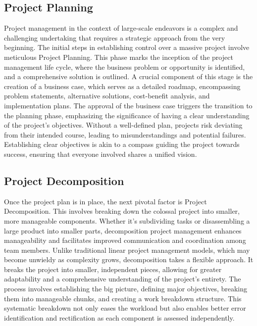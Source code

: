 \documentclass[runningheads]{llncs}
\begin{document}
\subsection{Project Planning}

Project management in the context of large-scale endeavors is a complex and challenging undertaking that requires a strategic approach from the very beginning. The initial steps in establishing control over a massive project involve meticulous Project Planning. This phase marks the inception of the project management life cycle, where the business problem or opportunity is identified, and a comprehensive solution is outlined. A crucial component of this stage is the creation of a business case, which serves as a detailed roadmap, encompassing problem statements, alternative solutions, cost-benefit analysis, and implementation plans. The approval of the business case triggers the transition to the planning phase, emphasizing the significance of having a clear understanding of the project's objectives. Without a well-defined plan, projects risk deviating from their intended course, leading to misunderstandings and potential failures. Establishing clear objectives is akin to a compass guiding the project towards success, ensuring that everyone involved shares a unified vision.

\subsection{Project Decomposition}

Once the project plan is in place, the next pivotal factor is Project Decomposition. This involves breaking down the colossal project into smaller, more manageable components. Whether it's subdividing tasks or disassembling a large product into smaller parts, decomposition project management enhances manageability and facilitates improved communication and coordination among team members. Unlike traditional linear project management models, which may become unwieldy as complexity grows, decomposition takes a flexible approach. It breaks the project into smaller, independent pieces, allowing for greater adaptability and a comprehensive understanding of the project's entirety. The process involves establishing the big picture, defining major objectives, breaking them into manageable chunks, and creating a work breakdown structure. This systematic breakdown not only eases the workload but also enables better error identification and rectification as each component is assessed independently.
\end{document}
